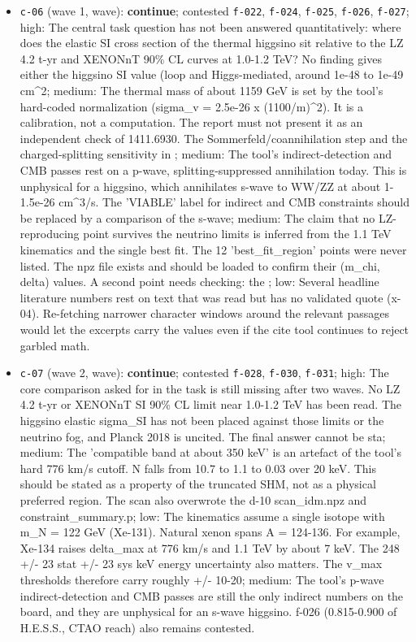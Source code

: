 \documentclass[11pt,a4paper]{article}
\begin{document}
\begin{itemize}
  \item \texttt{c-06} (wave 1, wave): \textbf{continue}; contested \texttt{f-022}, \texttt{f-024}, \texttt{f-025}, \texttt{f-026}, \texttt{f-027}; high: The central task question has not been answered quantitatively: where does the elastic SI cross section of the thermal higgsino sit relative to the LZ 4.2 t-yr and XENONnT 90\% CL curves at 1.0-1.2 TeV? No finding gives either the higgsino SI value (loop and Higgs-mediated, around 1e-48 to 1e-49 cm\textasciicircum{}2; medium: The thermal mass of about 1159 GeV is set by the tool's hard-coded normalization (sigma\_v = 2.5e-26 x (1100/m)\textasciicircum{}2). It is a calibration, not a computation. The report must not present it as an independent check of 1411.6930. The Sommerfeld/coannihilation step and the charged-splitting sensitivity in ; medium: The tool's indirect-detection and CMB passes rest on a p-wave, splitting-suppressed annihilation today. This is unphysical for a higgsino, which annihilates s-wave to WW/ZZ at about 1-1.5e-26 cm\textasciicircum{}3/s. The 'VIABLE' label for indirect and CMB constraints should be replaced by a comparison of the s-wave; medium: The claim that no LZ-reproducing point survives the neutrino limits is inferred from the 1.1 TeV kinematics and the single best fit. The 12 'best\_fit\_region' points were never listed. The npz file exists and should be loaded to confirm their (m\_chi, delta) values. A second point needs checking: the ; low: Several headline literature numbers rest on text that was read but has no validated quote (x-04). Re-fetching narrower character windows around the relevant passages would let the excerpts carry the values even if the cite tool continues to reject garbled math.
  \item \texttt{c-07} (wave 2, wave): \textbf{continue}; contested \texttt{f-028}, \texttt{f-030}, \texttt{f-031}; high: The core comparison asked for in the task is still missing after two waves. No LZ 4.2 t-yr or XENONnT SI 90\% CL limit near 1.0-1.2 TeV has been read. The higgsino elastic sigma\_SI has not been placed against those limits or the neutrino fog, and Planck 2018 is uncited. The final answer cannot be sta; medium: The 'compatible band at about 350 keV' is an artefact of the tool's hard 776 km/s cutoff. N falls from 10.7 to 1.1 to 0.03 over 20 keV. This should be stated as a property of the truncated SHM, not as a physical preferred region. The scan also overwrote the d-10 scan\_idm.npz and constraint\_summary.p; low: The kinematics assume a single isotope with m\_N = 122 GeV (Xe-131). Natural xenon spans A = 124-136. For example, Xe-134 raises delta\_max at 776 km/s and 1.1 TeV by about 7 keV. The 248 +/- 23 stat +/- 23 sys keV energy uncertainty also matters. The v\_max thresholds therefore carry roughly +/- 10-20; medium: The tool's p-wave indirect-detection and CMB passes are still the only indirect numbers on the board, and they are unphysical for an s-wave higgsino. f-026 (0.815-0.900 of H.E.S.S., CTAO reach) also remains contested.

\end{itemize}
\end{document}
